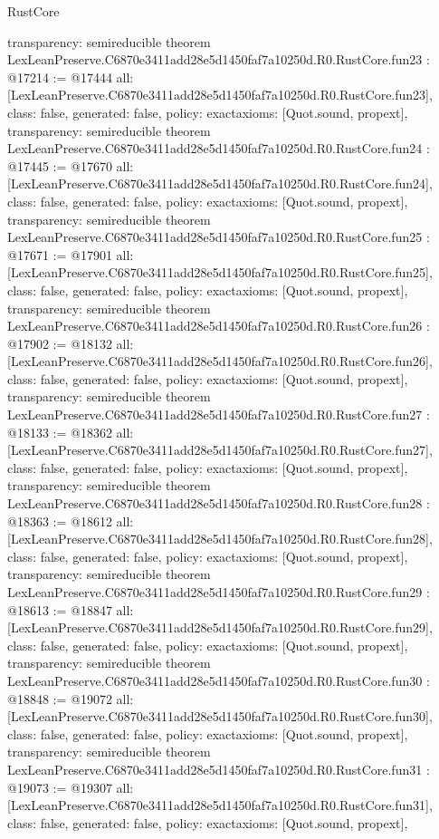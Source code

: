 \begin{lexlean}{RustCore}
\begin{coremodule}
{  transparency: semireducible
}
theorem LexLeanPreserve.C6870e3411add28e5d1450faf7a10250d.R0.RustCore.fun23 : @17214 := @17444 {
  all: [LexLeanPreserve.C6870e3411add28e5d1450faf7a10250d.R0.RustCore.fun23],
  class: false,
  generated: false,
  policy: exact{axioms: [Quot.sound, propext]},
  transparency: semireducible
}
theorem LexLeanPreserve.C6870e3411add28e5d1450faf7a10250d.R0.RustCore.fun24 : @17445 := @17670 {
  all: [LexLeanPreserve.C6870e3411add28e5d1450faf7a10250d.R0.RustCore.fun24],
  class: false,
  generated: false,
  policy: exact{axioms: [Quot.sound, propext]},
  transparency: semireducible
}
theorem LexLeanPreserve.C6870e3411add28e5d1450faf7a10250d.R0.RustCore.fun25 : @17671 := @17901 {
  all: [LexLeanPreserve.C6870e3411add28e5d1450faf7a10250d.R0.RustCore.fun25],
  class: false,
  generated: false,
  policy: exact{axioms: [Quot.sound, propext]},
  transparency: semireducible
}
theorem LexLeanPreserve.C6870e3411add28e5d1450faf7a10250d.R0.RustCore.fun26 : @17902 := @18132 {
  all: [LexLeanPreserve.C6870e3411add28e5d1450faf7a10250d.R0.RustCore.fun26],
  class: false,
  generated: false,
  policy: exact{axioms: [Quot.sound, propext]},
  transparency: semireducible
}
theorem LexLeanPreserve.C6870e3411add28e5d1450faf7a10250d.R0.RustCore.fun27 : @18133 := @18362 {
  all: [LexLeanPreserve.C6870e3411add28e5d1450faf7a10250d.R0.RustCore.fun27],
  class: false,
  generated: false,
  policy: exact{axioms: [Quot.sound, propext]},
  transparency: semireducible
}
theorem LexLeanPreserve.C6870e3411add28e5d1450faf7a10250d.R0.RustCore.fun28 : @18363 := @18612 {
  all: [LexLeanPreserve.C6870e3411add28e5d1450faf7a10250d.R0.RustCore.fun28],
  class: false,
  generated: false,
  policy: exact{axioms: [Quot.sound, propext]},
  transparency: semireducible
}
theorem LexLeanPreserve.C6870e3411add28e5d1450faf7a10250d.R0.RustCore.fun29 : @18613 := @18847 {
  all: [LexLeanPreserve.C6870e3411add28e5d1450faf7a10250d.R0.RustCore.fun29],
  class: false,
  generated: false,
  policy: exact{axioms: [Quot.sound, propext]},
  transparency: semireducible
}
theorem LexLeanPreserve.C6870e3411add28e5d1450faf7a10250d.R0.RustCore.fun30 : @18848 := @19072 {
  all: [LexLeanPreserve.C6870e3411add28e5d1450faf7a10250d.R0.RustCore.fun30],
  class: false,
  generated: false,
  policy: exact{axioms: [Quot.sound, propext]},
  transparency: semireducible
}
theorem LexLeanPreserve.C6870e3411add28e5d1450faf7a10250d.R0.RustCore.fun31 : @19073 := @19307 {
  all: [LexLeanPreserve.C6870e3411add28e5d1450faf7a10250d.R0.RustCore.fun31],
  class: false,
  generated: false,
  policy: exact{axioms: [Quot.sound, propext]},
}
\end{coremodule}
\end{lexlean}
